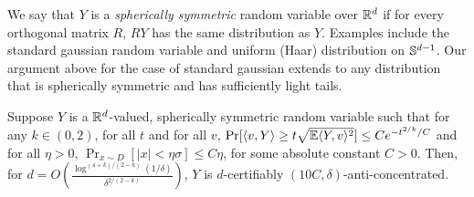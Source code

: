 We say that $Y$ is a \emph{spherically symmetric} random variable over $\R^d$ if for every orthogonal matrix $R$, $RY$ has the same distribution as $Y$. Examples include the standard gaussian random variable and uniform (Haar) distribution on $\S^{d-1}$. Our argument above for the case of standard gaussian extends to any distribution that is spherically symmetric and has sufficiently light tails. 

\begin{lemma} \label{lem:spherically-symmetric-certifiable-anti-concentration}
Suppose $Y$ is a $\R^d$-valued, spherically symmetric random variable  such that for any $k \in (0, 2)$, for all $t$ and for all $v$, 
$\Pr[\langle v,  Y\rangle \geq t \sqrt{\E \langle Y, v \rangle ^2}] \leq Ce^{-t^{2/k}/C}$ and for all $\eta > 0$, $\Pr_{x \sim D} [ |x| < \eta\sigma] \leq C\eta$, for some absolute constant $C >0$. Then, for $d = O\left(\frac{\log^{(4+k)/(2-k)}(1/\delta)}{\delta^{2/(2-k)}}\right)$, $Y$ is $d$-certifiably $(10C, \delta)$-anti-concentrated.
\end{lemma}



